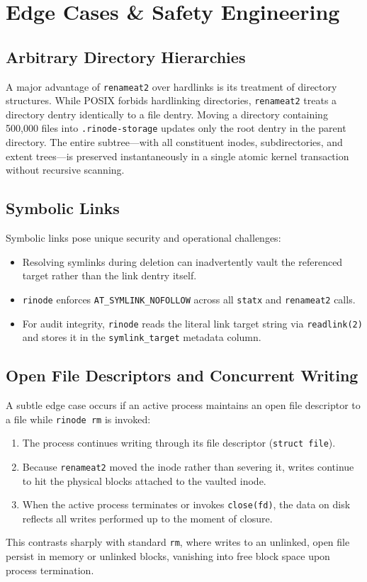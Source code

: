 \documentclass[11pt,a4paper]{article}
\begin{document}
\section{Edge Cases \& Safety Engineering}

\subsection{Arbitrary Directory Hierarchies}
A major advantage of \texttt{renameat2} over hardlinks is its treatment of directory structures. While POSIX forbids hardlinking directories, \texttt{renameat2} treats a directory dentry identically to a file dentry. Moving a directory containing 500,000 files into \texttt{.rinode-storage} updates only the root dentry in the parent directory. The entire subtree—with all constituent inodes, subdirectories, and extent trees—is preserved instantaneously in a single atomic kernel transaction without recursive scanning.

\subsection{Symbolic Links}
Symbolic links pose unique security and operational challenges:
\begin{itemize}[leftmargin=1.5em]
    \item Resolving symlinks during deletion can inadvertently vault the referenced target rather than the link dentry itself.
    \item \texttt{rinode} enforces \texttt{AT\_SYMLINK\_NOFOLLOW} across all \texttt{statx} and \texttt{renameat2} calls.
    \item For audit integrity, \texttt{rinode} reads the literal link target string via \texttt{readlink(2)} and stores it in the \texttt{symlink\_target} metadata column.
\end{itemize}

\subsection{Open File Descriptors and Concurrent Writing}
A subtle edge case occurs if an active process maintains an open file descriptor to a file while \texttt{rinode rm} is invoked:
\begin{enumerate}[leftmargin=1.5em]
    \item The process continues writing through its file descriptor (\texttt{struct file}).
    \item Because \texttt{renameat2} moved the inode rather than severing it, writes continue to hit the physical blocks attached to the vaulted inode.
    \item When the active process terminates or invokes \texttt{close(fd)}, the data on disk reflects all writes performed up to the moment of closure.
\end{enumerate}
This contrasts sharply with standard \texttt{rm}, where writes to an unlinked, open file persist in memory or unlinked blocks, vanishing into free block space upon process termination.
\end{document}
